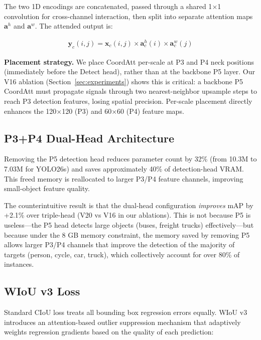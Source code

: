 \documentclass[11pt]{article}
\begin{document}
The two 1D encodings are concatenated, passed through a shared 1$\times$1 convolution for
cross-channel interaction, then split into separate attention maps $\mathbf{a}^h$ and
$\mathbf{a}^w$. The attended output is:

\begin{align}
    \mathbf{y}_c(i, j) = \mathbf{x}_c(i, j) \times \mathbf{a}^h_c(i) \times \mathbf{a}^w_c(j)
\end{align}

\textbf{Placement strategy.} We place CoordAtt per-scale at P3 and P4 neck positions (immediately
before the Detect head), rather than at the backbone P5 layer. Our V16 ablation (Section~\ref{sec:experiments})
shows this is critical: a backbone P5 CoordAtt must propagate signals through two nearest-neighbor
upsample steps to reach P3 detection features, losing spatial precision. Per-scale placement
directly enhances the 120$\times$120 (P3) and 60$\times$60 (P4) feature maps.

\subsection{P3+P4 Dual-Head Architecture}

Removing the P5 detection head reduces parameter count by 32\% (from 10.3M to 7.03M for YOLO26s)
and saves approximately 40\% of detection-head VRAM. This freed memory is reallocated to larger
P3/P4 feature channels, improving small-object feature quality.

The counterintuitive result is that the dual-head configuration \textit{improves} mAP by +2.1\%
over triple-head (V20 vs V16 in our ablations). This is not because P5 is useless—the P5 head
detects large objects (buses, freight trucks) effectively—but because under the 8 GB memory
constraint, the memory saved by removing P5 allows larger P3/P4 channels that improve the
detection of the majority of targets (person, cycle, car, truck), which collectively account
for over 80\% of instances.

\subsection{WIoU v3 Loss}

Standard CIoU loss treats all bounding box regression errors equally. WIoU v3 \cite{tong2023wise}
introduces an attention-based outlier suppression mechanism that adaptively weights regression
gradients based on the quality of each prediction:
\end{document}
